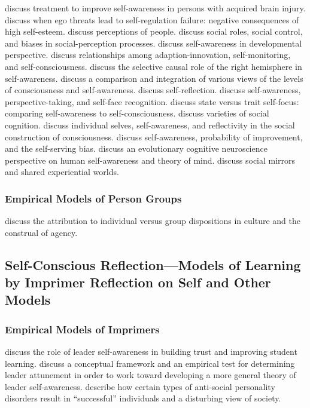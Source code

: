 \cite{goverover:2007} discuss treatment to improve self-awareness in persons with acquired brain injury.
\cite{baumeister:1993} discuss when ego threats lead to self-regulation failure: negative consequences of high self-esteem.
\cite{gilbert:2005} discuss perceptions of people.
\cite{ross:2005} discuss social roles, social control, and biases in social-perception processes.
\cite{hobson:2006} discuss self-awareness in developmental perspective.
\cite{hutchinson:2007} discuss relationships among adaption-innovation, self-monitoring, and self-consciousness.
\cite{keenan:2007} discuss the selective causal role of the right hemisphere in self-awareness.
\cite{morin:2004} discuss a comparison and integration of various views of the levels of consciousness and self-awareness.
\cite{silverman:2008} discuss self-reflection.
\cite{smith:2007} discuss self-awareness, perspective-taking, and self-face recognition.
\cite{soeiro:2008} discuss state versus trait self-focus: comparing self-awareness to self-consciousness.
\cite{uhlmann:2008} discuss varieties of social cognition.
\cite{burns:1998} discuss individual selves, self-awareness, and reflectivity in the social construction of consciousness.
\cite{duval:2002} discuss self-awareness, probability of improvement, and the self-serving bias.
\cite{focquaert:2008} discuss an evolutionary cognitive neuroscience perspective on human self-awareness and theory of mind.
\cite{whitehead:2001} discuss social mirrors and shared experiential worlds.


\subsubsection{Empirical Models of Person Groups}

\cite{menon:2005} discuss the attribution to individual versus group dispositions in culture and the construal of agency.

\subsection{Self-Conscious Reflection---Models of Learning by Imprimer Reflection on Self and Other Models}

\subsubsection{Empirical Models of Imprimers}

\cite{hinton:2008} discuss the role of leader self-awareness in building trust and improving student learning.
\cite{taylor:2007} discuss a conceptual framework and an empirical test for determining leader attunement in order to work toward developing a more general theory of leader self-awareness.
\cite{hare:1993} describe how certain types of anti-social personality disorders result in ``successful'' individuals and a disturbing view of society.

